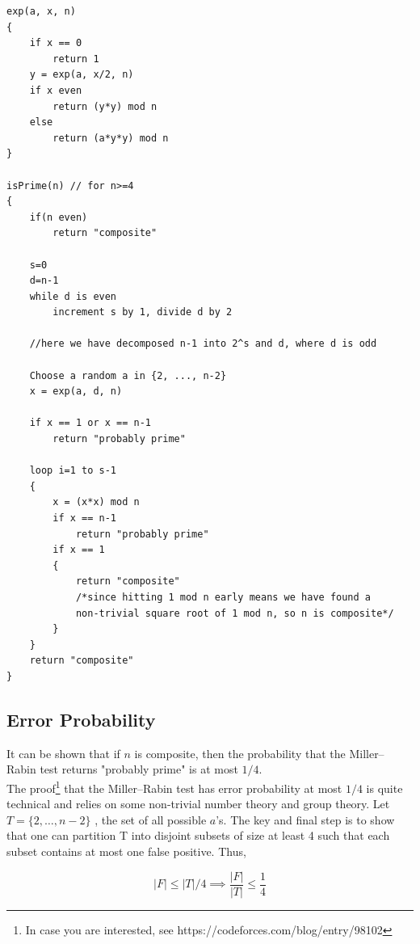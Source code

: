 \begin{center}
\begin{minipage}{0.9\linewidth}
\begin{framed}
\begin{Verbatim}
exp(a, x, n)
{
    if x == 0
        return 1
    y = exp(a, x/2, n)
    if x even
        return (y*y) mod n
    else
        return (a*y*y) mod n
}

isPrime(n) // for n>=4
{
    if(n even)
        return "composite"

    s=0
    d=n-1
    while d is even
        increment s by 1, divide d by 2
    
    //here we have decomposed n-1 into 2^s and d, where d is odd

    Choose a random a in {2, ..., n-2} 
    x = exp(a, d, n)

    if x == 1 or x == n-1
        return "probably prime"

    loop i=1 to s-1
    {
        x = (x*x) mod n
        if x == n-1
            return "probably prime"
        if x == 1
        {
            return "composite" 
            /*since hitting 1 mod n early means we have found a 
            non-trivial square root of 1 mod n, so n is composite*/
        }
    }
    return "composite"
}
\end{Verbatim}
\vspace{-4mm}
\end{framed}
\end{minipage}
\end{center}


\subsection{Error Probability}

It can be shown that if \(n\) is composite, then the probability that the Miller--Rabin test 
returns "probably prime" is at most \(1/4\).\\


\noindent The proof\footnote{In case you are interested, see https://codeforces.com/blog/entry/98102} that the Miller--Rabin test has error probability at most \(1/4\) is 
quite technical and relies on some non-trivial number theory and group theory. Let $T=\{2,\dots,n-2\}$ 
, the set of all possible $a$'s. The key and final step is to show that one can partition T into 
disjoint subsets of size at least 4 such that each subset contains at most one false positive. Thus, 

\[
|F|\le |T|/4
\implies 
\frac{|F|}{|T|} \le \frac{1}{4}
\]

